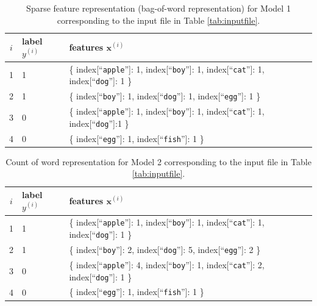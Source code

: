 \documentclass[11pt]{article}
\numberwithin{equation}{section} %
\numberwithin{figure}{section} %
\numberwithin{table}{section} %
\newcommand{\xv}{\mathbf{x}}
\begin{document}
\begin{table}[p]
    \centering
%
\begin{tabular}{cll}
\toprule
$i$ & {\bf label} $y^{(i)}$ & {\bf features} $\xv^{(i)}$ \\
\midrule
1 & 1 &  \{ index[``{\tt apple}'']: 1, index[``{\tt boy}'']: 1, index[``{\tt cat}'']: 1, index[``{\tt dog}'']: 1 \} \\
2 & 1 & \{ index[``{\tt boy}'']: 1, index[``{\tt dog}'']: 1, index[``{\tt egg}'']: 1 \} \\
3 & 0 & \{ index[``{\tt apple}'']: 1, index[``{\tt boy}'']: 1, index[``{\tt cat}'']: 1, index[``{\tt dog}'']:1 \} \\
4 & 0 & \{ index[``{\tt egg}'']: 1, index[``{\tt fish}'']: 1 \} \\

\bottomrule
\end{tabular}
%
    \caption{Sparse feature representation (bag-of-word representation) for Model 1 corresponding to the input file in Table \ref{tab:inputfile}.}
    \label{tab:model1sparse}
\end{table}




\begin{table}[p]
    \centering
%
\begin{tabular}{cll}
\toprule
$i$ & {\bf label} $y^{(i)}$ & {\bf features} $\xv^{(i)}$ \\
\midrule
1 & 1 &  \{ index[``{\tt apple}'']: 1, index[``{\tt boy}'']: 1, index[``{\tt cat}'']: 1, index[``{\tt dog}'']: 1 \} \\
2 & 1 & \{ index[``{\tt boy}'']: 2, index[``{\tt dog}'']: 5, index[``{\tt egg}'']: 2 \} \\
3 & 0 & \{ index[``{\tt apple}'']: 4, index[``{\tt boy}'']: 1, index[``{\tt cat}'']: 2, index[``{\tt dog}'']: 1 \} \\
4 & 0 & \{ index[``{\tt egg}'']: 1, index[``{\tt fish}'']: 1 \} \\
\bottomrule
\end{tabular}
%
    \caption{Count of word representation  for Model 2 corresponding to the input file in Table \ref{tab:inputfile}. }
    \label{tab:countofword}
\end{table}
\end{document}
